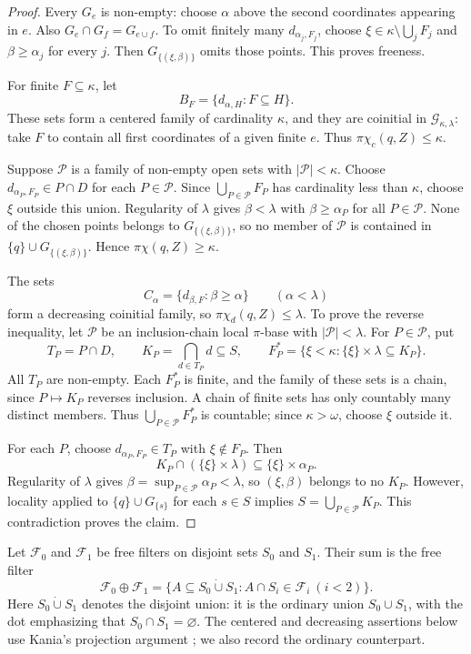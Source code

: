 \documentclass[11pt,a4paper]{amsart}
\theoremstyle{definition}
\theoremstyle{remark}
\newcommand{\F}{\mathcal F}
\newcommand{\G}{\mathcal G}
\newcommand{\pc}{\pi\chi}
\newcommand{\pcc}{\pi\chi_c}
\newcommand{\pcd}{\pi\chi_d}
\begin{document}
\begin{proof}
Every $G_e$ is non-empty: choose $\alpha$ above the second coordinates appearing in $e$. Also $G_e\cap G_f=G_{e\cup f}$. To omit finitely many $d_{\alpha_j,F_j}$, choose $\xi\in\kappa\setminus\bigcup_jF_j$ and $\beta\geqslant\alpha_j$ for every $j$. Then $G_{\{(\xi,\beta)\}}$ omits those points. This proves freeness.

For finite $F\subseteq\kappa$, let
\[
B_F=\{d_{\alpha,H}:F\subseteq H\}.
\]
These sets form a centered family of cardinality $\kappa$, and they are coinitial in $\G_{\kappa,\lambda}$: take $F$ to contain all first coordinates of a given finite $e$. Thus $\pcc(q,Z)\leqslant\kappa$.

Suppose $\mathcal P$ is a family of non-empty open sets with $|\mathcal P|<\kappa$. Choose $d_{\alpha_P,F_P}\in P\cap D$ for each $P\in\mathcal P$. Since $\bigcup_{P\in\mathcal P}F_P$ has cardinality less than $\kappa$, choose $\xi$ outside this union. Regularity of $\lambda$ gives $\beta<\lambda$ with $\beta\geqslant\alpha_P$ for all $P\in\mathcal P$. None of the chosen points belongs to $G_{\{(\xi,\beta)\}}$, so no member of $\mathcal P$ is contained in $\{q\}\cup G_{\{(\xi,\beta)\}}$. Hence $\pc(q,Z)\geqslant\kappa$.

The sets
\[
C_\alpha=\{d_{\beta,F}:\beta\geqslant\alpha\}\qquad(\alpha<\lambda)
\]
form a decreasing coinitial family, so $\pcd(q,Z)\leqslant\lambda$. To prove the reverse inequality, let $\mathcal P$ be an inclusion-chain local $\pi$-base with $|\mathcal P|<\lambda$. For $P\in\mathcal P$, put
\[
T_P=P\cap D,\qquad K_P=\bigcap_{d\in T_P}d\subseteq S,
\qquad F_P^*=\{\xi<\kappa:\{\xi\}\times\lambda\subseteq K_P\}.
\]
All $T_P$ are non-empty. Each $F_P^*$ is finite, and the family of these sets is a chain, since $P\mapsto K_P$ reverses inclusion. A chain of finite sets has only countably many distinct members. Thus $\bigcup_{P\in\mathcal P}F_P^*$ is countable; since $\kappa>\omega$, choose $\xi$ outside it.

For each $P$, choose $d_{\alpha_P,F_P}\in T_P$ with $\xi\notin F_P$. Then
\[
K_P\cap(\{\xi\}\times\lambda)\subseteq\{\xi\}\times\alpha_P.
\]
Regularity of $\lambda$ gives $\beta=\sup_{P\in\mathcal P}\alpha_P<\lambda$, so $(\xi,\beta)$ belongs to no $K_P$. However, locality applied to $\{q\}\cup G_{\{s\}}$ for each $s\in S$ implies $S=\bigcup_{P\in\mathcal P}K_P$. This contradiction proves the claim.
\end{proof}

Let $\F_0$ and $\F_1$ be free filters on disjoint sets $S_0$ and $S_1$. Their sum is the free filter
\[
\F_0\oplus\F_1=
\{A\subseteq S_0\mathbin{\dot\cup}S_1:A\cap S_i\in\F_i\ (i<2)\}.
\]
Here $S_0\mathbin{\dot\cup}S_1$ denotes the disjoint union: it is the ordinary union $S_0\cup S_1$, with the dot emphasizing that $S_0\cap S_1=\varnothing$.
The centered and decreasing assertions below use Kania's projection argument
\cite[Lemma 2.7]{Kania}; we also record the ordinary counterpart.
\end{document}
